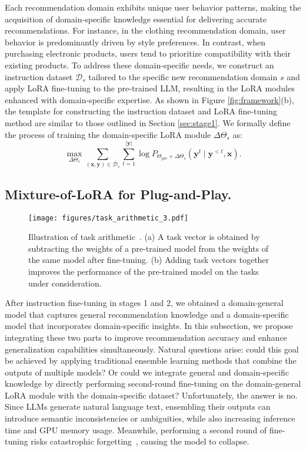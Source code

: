 Each recommendation domain exhibits unique user behavior patterns, making the acquisition of domain-specific knowledge essential for delivering accurate recommendations. For instance, in the clothing recommendation domain, user behavior is predominantly driven by style preferences. In contrast, when purchasing electronic products, users tend to prioritize compatibility with their existing products. To address these domain-specific needs, we construct an instruction dataset $\mathcal{D}_s$ tailored to the specific new recommendation domain $s$ and apply LoRA fine-tuning to the pre-trained LLM, resulting in the LoRA modules enhanced with domain-specific expertise. 
As shown in Figure \ref{fig:framework}(b), the template for constructing the instruction dataset and LoRA fine-tuning method are similar to those outlined in Section \ref{sec:stage1}. We formally define the process of training the domain-specific LoRA module $\Delta\Theta_s$ as:
\begin{equation}
\max _{\Delta\Theta_s} \sum_{(\mathbf{x},\mathbf{y})\in \mathcal{D}_s} \sum_{t=1}^{|\mathbf{y}|} \log P_{\Theta_{\text{pre}} +\Delta\Theta_s}\left(\mathbf{y}^t \mid \mathbf{y}^{<t}, \mathbf{x}\right).
\end{equation}

\subsection{Mixture-of-LoRA for Plug-and-Play.}
\label{sec:stage3_1}
\begin{figure}[b]
\vspace{-8mm}
    \centering \texttt{[image: figures/task\_arithmetic\_3.pdf]}
    \vspace{-0.2cm}
    \caption{Illustration of task arithmetic~\cite{ilharco2023editing}. (a) A task vector is obtained by subtracting the weights of a pre-trained model from the weights of the same model after fine-tuning. (b) Adding task vectors together improves the performance of the pre-trained model on the tasks under consideration.}
    \label{fig:task_arithmetic}
    \Description{}
\end{figure}


After instruction fine-tuning in stages 1 and 2, we obtained a domain-general model that captures general recommendation knowledge and a domain-specific model that incorporates domain-specific insights. In this subsection, we propose integrating these two parts to improve recommendation accuracy and enhance generalization capabilities simultaneously.
Natural questions arise: could this goal be achieved by applying traditional ensemble learning methods that combine the outputs of multiple models? Or could we integrate general and domain-specific knowledge by directly performing second-round fine-tuning on the domain-general LoRA module with the domain-specific dataset?
Unfortunately, the answer is no. Since LLMs generate natural language text, ensembling their outputs can introduce semantic inconsistencies or ambiguities, while also increasing inference time and GPU memory usage. Meanwhile, performing a second round of fine-tuning risks catastrophic forgetting~\cite{kirkpatrick2017overcoming}, causing the model to collapse.

